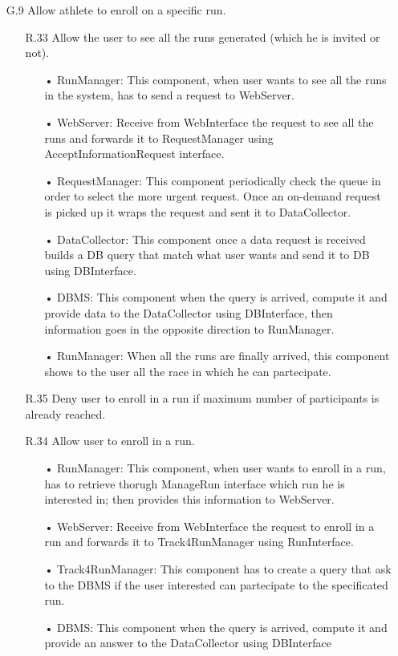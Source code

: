 \begin{enumerate}
\item [G.9] Allow athlete to enroll on a specific run.
	\begin{enumerate}
	\item [R.33] Allow the user to see all the runs generated (which he is invited or not).
		\begin{enumerate}
		\item[•] RunManager: This component, when user wants to see all the runs in the system, has to send a request to WebServer.
		\item[•] WebServer: Receive from WebInterface the request to see all the runs and forwards it to RequestManager using AcceptInformationRequest interface.
		\item[•] RequestManager: This component periodically check the queue in order to select the more urgent request. Once an on-demand request is picked up it wraps the request and sent it to DataCollector.
		\item[•] DataCollector: This component once a data request is received builds a DB query that match what user wants and send it to DB using DBInterface.
		\item[•] DBMS: This component when the query is arrived, compute it and provide data to the DataCollector using DBInterface, then information goes in the opposite direction to RunManager.
		\item[•] RunManager: When all the runs are finally arrived, this component shows to the user all the race in which he can partecipate.
		\end{enumerate}	
	\item [R.35] Deny user to enroll in a run if maximum number of participants is already reached.
	\item [R.34] Allow user to enroll in a run.
		\begin{enumerate}
		\item[•] RunManager: This component, when user wants to enroll in a run, has to retrieve thorugh ManageRun interface which run he is interested in; then provides this information to WebServer.
		\item[•] WebServer: Receive from WebInterface the request to enroll in a run and forwards it to Track4RunManager using RunInterface.
		\item[•] Track4RunManager: This component has to create a query that ask to the DBMS if the user interested can partecipate to the specificated run.
		\item[•] DBMS: This component when the query is arrived, compute it and provide an answer to the DataCollector using DBInterface

\end{enumerate}
\end{enumerate}
\end{enumerate}
